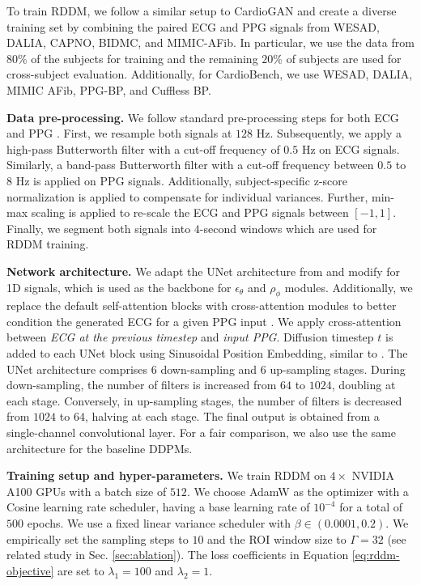 \documentclass[letterpaper]{article} %
\begin{document}
\noindent To train RDDM, we follow a similar setup to CardioGAN \cite{sarkar2021cardiogan} and create a diverse training set by combining the paired ECG and PPG signals from WESAD, DALIA, CAPNO, BIDMC, and MIMIC-AFib. In particular, we use the data from $80\%$ of the subjects for training and the remaining $20\%$ of subjects are used for cross-subject evaluation. Additionally, for CardioBench, we use WESAD, DALIA, MIMIC AFib, PPG-BP, and Cuffless BP.







\noindent \textbf{Data pre-processing.}
We follow standard pre-processing steps for both ECG \cite{pan1985real, Makowski2021neurokit} and PPG \cite{Makowski2021neurokit}. First, we resample both signals at $128$ Hz. Subsequently, we apply a high-pass Butterworth filter with a cut-off frequency of $0.5$ Hz on ECG signals. Similarly, a band-pass Butterworth filter with a cut-off frequency between $0.5$ to $8$ Hz is applied on PPG signals. Additionally, subject-specific z-score normalization is applied to compensate for individual variances. Further, min-max scaling is applied to re-scale the ECG and PPG signals between $[-1, 1]$. Finally, we segment both signals into $4$-second windows which are used for RDDM training.

\noindent\textbf{Network architecture.} We adapt the UNet architecture from \cite{ho2020denoising, dhariwal2021diffusion} and modify for 1D signals, which is used as the backbone for $\epsilon_{\theta}$ and $\rho_{\phi}$ modules. Additionally, we replace the default self-attention blocks with cross-attention modules to better condition the generated ECG for a given PPG input \cite{saharia2022photorealistic}. We apply cross-attention between \textit{ECG at the previous timestep} and \textit{input PPG}. Diffusion timestep $t$ is added to each UNet block using Sinusoidal Position Embedding, similar to \cite{ho2020denoising, dhariwal2021diffusion, saharia2022photorealistic}.
The UNet architecture comprises $6$ down-sampling and $6$ up-sampling stages. During down-sampling, the number of filters is increased from $64$ to $1024$, doubling at each stage. Conversely, in up-sampling stages, the number of filters is decreased from $1024$ to $64$, halving at each stage. The final output is obtained from a single-channel convolutional layer. For a fair comparison, we also use the same architecture for the baseline DDPMs.

\noindent \textbf{Training setup and hyper-parameters.} We train RDDM on $4\times$ NVIDIA A100 GPUs with a batch size of $512$. We choose AdamW \cite{loshchilov2018decoupled} as the optimizer with a Cosine learning rate scheduler, having a base learning rate of $10^{-4}$ for a total of $500$ epochs.
We use a fixed linear variance scheduler with $\beta \in (0.0001, 0.2)$. We empirically set the sampling steps to $10$ and the ROI window size to $\Gamma = 32$ (see related study in Sec. \ref{sec:ablation}). The loss coefficients in Equation \ref{eq:rddm-objective} are set to $\lambda_{1} = 100$ and $\lambda_{2} = 1$.
\end{document}
